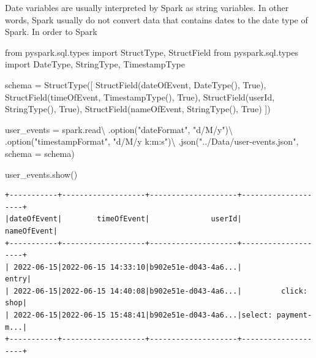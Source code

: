 \documentclass[
  11pt,
  letterpaper,
  DIV=11,
  numbers=noendperiod]{scrreprt}
\newenvironment{Shaded}{\begin{snugshade}}{\end{snugshade}}
\newcommand{\ImportTok}[1]{\textcolor[rgb]{0.00,0.46,0.62}{#1}}
\newcommand{\NormalTok}[1]{\textcolor[rgb]{0.00,0.23,0.31}{#1}}
\newcommand{\OperatorTok}[1]{\textcolor[rgb]{0.37,0.37,0.37}{#1}}
\newcommand{\StringTok}[1]{\textcolor[rgb]{0.13,0.47,0.30}{#1}}
\newcommand{\VariableTok}[1]{\textcolor[rgb]{0.07,0.07,0.07}{#1}}
\begin{document}
Date variables are usually interpreted by Spark as string variables. In
other words, Spark usually do not convert data that contains dates to
the date type of Spark. In order to Spark

\begin{Shaded}
\begin{Highlighting}[]
\ImportTok{from}\NormalTok{ pyspark.sql.types }\ImportTok{import}\NormalTok{ StructType, StructField}
\ImportTok{from}\NormalTok{ pyspark.sql.types }\ImportTok{import}\NormalTok{ DateType, StringType, TimestampType}

\NormalTok{schema }\OperatorTok{=}\NormalTok{ StructType([}
\NormalTok{  StructField(}\StringTok{\textquotesingle{}dateOfEvent\textquotesingle{}}\NormalTok{, DateType(), }\VariableTok{True}\NormalTok{),}
\NormalTok{  StructField(}\StringTok{\textquotesingle{}timeOfEvent\textquotesingle{}}\NormalTok{, TimestampType(), }\VariableTok{True}\NormalTok{),}
\NormalTok{  StructField(}\StringTok{\textquotesingle{}userId\textquotesingle{}}\NormalTok{, StringType(), }\VariableTok{True}\NormalTok{),}
\NormalTok{  StructField(}\StringTok{\textquotesingle{}nameOfEvent\textquotesingle{}}\NormalTok{, StringType(), }\VariableTok{True}\NormalTok{)}
\NormalTok{])}

\NormalTok{user\_events }\OperatorTok{=}\NormalTok{ spark.read}\OperatorTok{\textbackslash{}}
\NormalTok{  .option(}\StringTok{"dateFormat"}\NormalTok{, }\StringTok{"d/M/y"}\NormalTok{)}\OperatorTok{\textbackslash{}}
\NormalTok{  .option(}\StringTok{"timestampFormat"}\NormalTok{, }\StringTok{"d/M/y k:m:s"}\NormalTok{)}\OperatorTok{\textbackslash{}}
\NormalTok{  .json(}\StringTok{"../Data/user{-}events.json"}\NormalTok{, schema }\OperatorTok{=}\NormalTok{ schema)}
  
\NormalTok{user\_events.show()}
\end{Highlighting}
\end{Shaded}

\begin{verbatim}
+-----------+-------------------+--------------------+--------------------+
|dateOfEvent|        timeOfEvent|              userId|         nameOfEvent|
+-----------+-------------------+--------------------+--------------------+
| 2022-06-15|2022-06-15 14:33:10|b902e51e-d043-4a6...|               entry|
| 2022-06-15|2022-06-15 14:40:08|b902e51e-d043-4a6...|         click: shop|
| 2022-06-15|2022-06-15 15:48:41|b902e51e-d043-4a6...|select: payment-m...|
+-----------+-------------------+--------------------+--------------------+
\end{verbatim}
\end{document}
